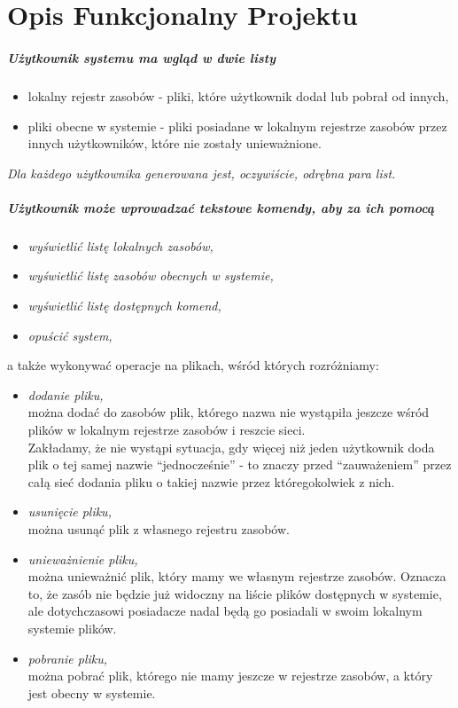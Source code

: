 \documentclass[11pt,oneside]{book}
\newcommand{\+}{\discretionary{\mbox{\scriptsize$\hookleftarrow$}}{}{}}
\begin{document}
\chapter{Opis Funkcjonalny Projektu}
\paragraph{Użytkownik systemu ma wgląd w dwie listy}
\begin{itemize}
\item
lokalny rejestr zasobów - pliki, które użytkownik dodał lub pobrał od innych,
\item
pliki obecne w systemie - pliki posiadane w lokalnym rejestrze zasobów przez innych użytkowników, które nie zostały unieważnione.
\end{itemize}
\textsl{Dla każdego użytkownika generowana jest, oczywiście, odrębna para list.}

\paragraph{Użytkownik może wprowadzać tekstowe komendy, aby za ich pomocą}
\begin{itemize}
\item
\textsl{wyświetlić listę lokalnych zasobów,}
\item 
\textsl{wyświetlić listę zasobów obecnych w systemie,}
\item
\textsl{wyświetlić listę dostępnych komend,}
\item
\textsl{opuścić system,}
\end{itemize}
a także wykonywać operacje na plikach, wśród których rozróżniamy:
\begin{itemize}
\item
\textsl{dodanie pliku,}\\
można dodać do zasobów plik, którego nazwa nie wystąpiła jeszcze wśród plików w lokalnym rejestrze zasobów i reszcie sieci.\\
Zakładamy, że nie wystąpi sytuacja, gdy więcej niż jeden użytkownik doda plik o tej samej nazwie “jednocześnie” - to znaczy przed “zauważeniem” przez całą sieć dodania pliku o takiej nazwie przez któregokolwiek z nich.
\item
\textsl{usunięcie pliku,}\\
można usunąć plik z własnego rejestru zasobów.
\item
\textsl{unieważnienie pliku,}\\
można unieważnić plik, który mamy we własnym rejestrze zasobów. Oznacza to, że zasób nie będzie już widoczny na liście plików dostępnych w systemie, ale dotychczasowi posiadacze nadal będą go posiadali w swoim lokalnym systemie plików.
\item
\textsl{pobranie pliku,}\\
można pobrać plik, którego nie mamy jeszcze w rejestrze zasobów, a który jest obecny w systemie.
\end{itemize}
\end{document}
